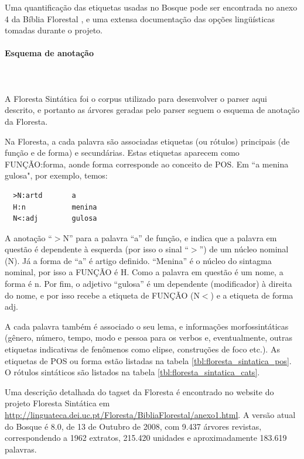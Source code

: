 Uma quantificação das etiquetas usadas no Bosque pode ser encontrada no anexo 4 da Bíblia Florestal \cite{florestasintatica}, e uma extensa documentação das opções lingüísticas tomadas durante o projeto.


\paragraph{Esquema de anotação}\label{par:corpus_bosque_esquema}\hspace*{1in}\\ \\

A Floresta Sintática foi o corpus utilizado para desenvolver o parser aqui descrito, e portanto as árvores geradas pelo parser seguem o esquema de anotação da Floresta.

Na Floresta, a cada palavra são associadas etiquetas (ou rótulos) principais (de função e de forma) e secundárias. Estas etiquetas aparecem como FUNÇÃO:forma, aonde forma corresponde ao conceito de POS. Em ``a menina gulosa", por exemplo, temos:


\begin{verbatim}
  >N:artd       a
  H:n           menina
  N<:adj        gulosa
\end{verbatim}

A anotação ``$>$N'' para a palavra ``a'' de função, e indica que a palavra em questão é dependente à esquerda (por isso o sinal ``$>$'') de um núcleo nominal (N). Já a forma de ``a'' é artigo definido. ``Menina'' é o núcleo do sintagma nominal, por isso a FUNÇÃO é H. Como a palavra em questão é um nome, a forma é n. Por fim, o adjetivo ``gulosa'' é um dependente (modificador) à direita do nome, e por isso recebe a etiqueta de FUNÇÃO (N$<$) e a etiqueta de forma adj.

A cada palavra também é associado o seu lema, e informações morfossintáticas (gênero, número, tempo, modo e pessoa para os verbos e, eventualmente, outras etiquetas indicativas de fenômenos como elipse, construções de foco etc.). As etiquetas de POS ou forma estão listadas na tabela \ref{tbl:floresta_sintatica_pos}. O rótulos sintáticos são listados na tabela \ref{tbl:floresta_sintatica_cats}.

Uma descrição detalhada do tagset da Floresta é encontrado no website do projeto Floresta Sintática em \url{http://linguateca.dei.uc.pt/Floresta/BibliaFlorestal/anexo1.html}. A versão atual do Bosque é 8.0, de 13 de Outubro de 2008, com 9.437 árvores revistas, correspondendo a 1962 extratos, 215.420 unidades e aproximadamente 183.619 palavras.


